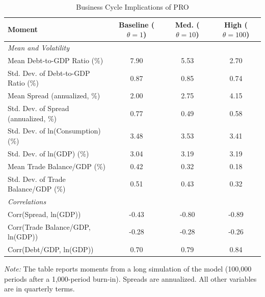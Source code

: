 \documentclass[12pt]{article}
\theoremstyle{plain}
\begin{document}
\begin{table}[h]
	\centering
	\caption{Business Cycle Implications of PRO}
	\label{tab:main_results}
	\begin{tabular}{@{}lccc@{}}
		\toprule
		Moment                               & Baseline ($\theta=1$) & Med. ($\theta=10$) & High  ($\theta=100$) \\ \midrule
		\multicolumn{3}{l}{\textit{Mean and Volatility}}                                                         \\
		Mean Debt-to-GDP Ratio (\%)          & 7.90                  & 5.53               & 2.70                 \\
		Std. Dev. of Debt-to-GDP Ratio (\%)  & 0.87                  & 0.85               & 0.74                 \\
		Mean Spread (annualized, \%)         & 2.00                  & 2.75               & 4.15                 \\
		Std. Dev. of Spread (annualized, \%) & 0.77                  & 0.49               & 0.58                 \\
		Std. Dev. of ln(Consumption) (\%)    & 3.48                  & 3.53               & 3.41                 \\
		Std. Dev. of ln(GDP) (\%)            & 3.04                  & 3.19               & 3.19                 \\
		Mean Trade Balance/GDP (\%)          & 0.42                  & 0.32               & 0.18                 \\
		Std. Dev. of Trade Balance/GDP (\%)  & 0.51                  & 0.43               & 0.32                 \\
		\multicolumn{3}{l}{\textit{Correlations}}                                                                \\
		Corr(Spread, ln(GDP))                & -0.43                 & -0.80              & -0.89                \\
		Corr(Trade Balance/GDP, ln(GDP))     & -0.28                 & -0.28              & -0.26                \\
		Corr(Debt/GDP, ln(GDP))              & 0.70                  & 0.79               & 0.84                 \\ \bottomrule
	\end{tabular}
	\parbox{\linewidth}{\small\textit{Note:} The table reports moments from a long simulation of the model (100,000 periods after a 1,000-period burn-in). Spreads are annualized. All other variables are in quarterly terms.}

\end{table}
\end{document}
